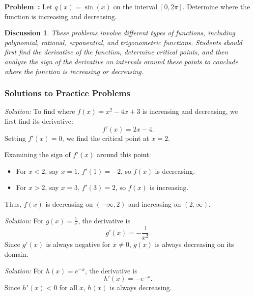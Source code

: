 \documentclass[a4paper,12pt]{book}
\newcounter{problem}
\newenvironment{problem}[1][\theproblem]
{\refstepcounter{problem}\par\medskip\noindent\textbf{Problem~#1:} \rmfamily}{\medskip}
\newenvironment{solution}[1][]
{\par\noindent\textit{Solution:} \rmfamily}{\medskip}
\newtheorem{discussion}{Discussion}
\begin{document}
\begin{problem}
Let \( q(x) = \sin(x) \) on the interval \( [0, 2\pi] \). Determine where the function is increasing and decreasing.
\end{problem}

\begin{discussion}
These problems involve different types of functions, including polynomial, rational, exponential, and trigonometric functions. Students should first find the derivative of the function, determine critical points, and then analyze the sign of the derivative on intervals around these points to conclude where the function is increasing or decreasing.
\end{discussion}

\subsubsection*{Solutions to Practice Problems}

\begin{solution}[Problem 1]
To find where \( f(x) = x^2 - 4x + 3 \) is increasing and decreasing, we first find its derivative:
\[ f'(x) = 2x - 4. \]
Setting \( f'(x) = 0 \), we find the critical point at \( x = 2 \). 

Examining the sign of \( f'(x) \) around this point:
\begin{itemize}
    \item For \( x < 2 \), say \( x = 1 \), \( f'(1) = -2 \), so \( f(x) \) is decreasing.
    \item For \( x > 2 \), say \( x = 3 \), \( f'(3) = 2 \), so \( f(x) \) is increasing.
\end{itemize}
Thus, \( f(x) \) is decreasing on \((- \infty, 2)\) and increasing on \((2, \infty)\).
\end{solution}

\begin{solution}[Problem 2]
For \( g(x) = \frac{1}{x} \), the derivative is
\[ g'(x) = -\frac{1}{x^2}. \]
Since \( g'(x) \) is always negative for \( x \neq 0 \), \( g(x) \) is always decreasing on its domain.
\end{solution}

\begin{solution}[Problem 3]
For \( h(x) = e^{-x} \), the derivative is
\[ h'(x) = -e^{-x}. \]
Since \( h'(x) < 0 \) for all \( x \), \( h(x) \) is always decreasing.
\end{solution}
\end{document}
